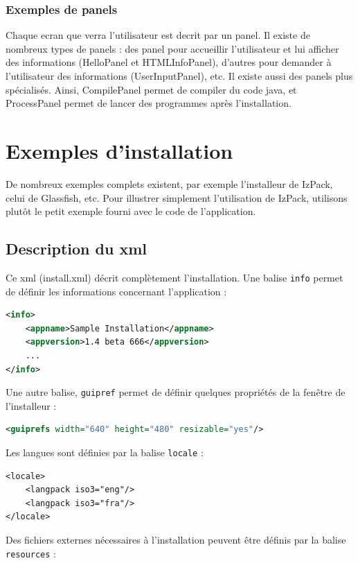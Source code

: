 \subsubsection{Exemples de panels}
Chaque ecran que verra l'utilisateur est decrit par un panel.
Il existe de nombreux types de panels : des panel pour accueillir l'utilisateur et lui afficher des informations (HelloPanel et HTMLInfoPanel), d'autres pour demander à l'utilisateur des informations (UserInputPanel), etc.
Il existe aussi des panels plus spécialisés. Ainsi, CompilePanel permet de compiler du code java, et ProcessPanel permet de lancer des programmes après l'installation.


\section{Exemples d'installation}
De nombreux exemples complets existent, par exemple l'installeur de IzPack, celui de Glassfish, etc. Pour illustrer simplement l'utilisation de IzPack, utilisons plutôt le petit exemple fourni avec le code de l'application.

\subsection{Description du xml}

Ce xml (install.xml) décrit complètement l'installation.
Une balise \verb|info| permet de définir les informations concernant l'application : 
\begin{lstlisting}[language=xml]
<info>
	<appname>Sample Installation</appname>
	<appversion>1.4 beta 666</appversion>
	...
</info>
\end{lstlisting}
Une autre balise, \verb|guipref| permet de définir quelques propriétés de la fenêtre de l'installeur :
\begin{lstlisting}[language=xml]
<guiprefs width="640" height="480" resizable="yes"/>
\end{lstlisting}
Les langues sont définies par la balise \verb|locale| :
\begin{lstlisting}
<locale>
	<langpack iso3="eng"/>
	<langpack iso3="fra"/>
</locale>
\end{lstlisting}
Des fichiers externes nécessaires à l'installation peuvent être définis par la balise \verb|resources| :


